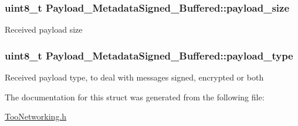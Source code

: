 \subsubsection[{\texorpdfstring{payload\+\_\+size}{payload_size}}]{\setlength{\rightskip}{0pt plus 5cm}uint8\+\_\+t Payload\+\_\+\+Metadata\+Signed\+\_\+\+Buffered\+::payload\+\_\+size}\hypertarget{structPayload__MetadataSigned__Buffered_a7c8d197be9b17df157c235590f6687bf}{}\label{structPayload__MetadataSigned__Buffered_a7c8d197be9b17df157c235590f6687bf}
Received payload size 
\subsubsection[{\texorpdfstring{payload\+\_\+type}{payload_type}}]{\setlength{\rightskip}{0pt plus 5cm}uint8\+\_\+t Payload\+\_\+\+Metadata\+Signed\+\_\+\+Buffered\+::payload\+\_\+type}\hypertarget{structPayload__MetadataSigned__Buffered_a2722ee42fee988e9274b2af780431bde}{}\label{structPayload__MetadataSigned__Buffered_a2722ee42fee988e9274b2af780431bde}
Received payload type, to deal with messages signed, encrypted or both 

The documentation for this struct was generated from the following file\+:\begin{DoxyCompactItemize}
\item 
\hyperlink{TooNetworking_8h}{Too\+Networking.\+h}\end{DoxyCompactItemize}
